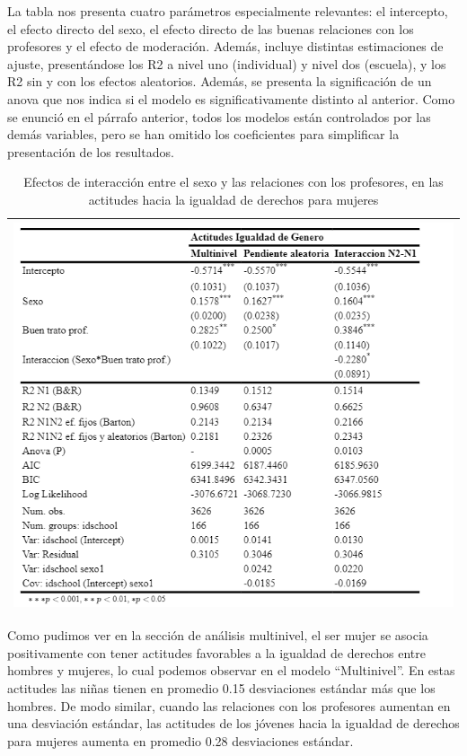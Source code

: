 \documentclass[12pt,twoside]{templates/facsothesis}
\begin{document}
La tabla nos presenta cuatro parámetros especialmente relevantes: el intercepto, el efecto directo del sexo, el efecto directo de las buenas relaciones con los profesores y el efecto de moderación. Además, incluye distintas estimaciones de ajuste, presentándose los R2 a nivel uno (individual) y nivel dos (escuela), y los R2 sin y con los efectos aleatorios. Además, se presenta la significación de un anova que nos indica si el modelo es significativamente distinto al anterior. Como se enunció en el párrafo anterior, todos los modelos están controlados por las demás variables, pero se han omitido los coeficientes para simplificar la presentación de los resultados.

\begin{longtable}[]{@{}l@{}}
\caption{\label{tab:unnamed-chunk-11}Efectos de interacción entre el sexo y las relaciones con los profesores, en las actitudes hacia la igualdad de derechos para mujeres}\tabularnewline
\toprule
\endhead
\includegraphics[width=\textwidth,height=1\textheight]{input/images/INTERACCION1.png} \\
\bottomrule
\end{longtable}

Como pudimos ver en la sección de análisis multinivel, el ser mujer se asocia positivamente con tener actitudes favorables a la igualdad de derechos entre hombres y mujeres, lo cual podemos observar en el modelo ``Multinivel''. En estas actitudes las niñas tienen en promedio 0.15 desviaciones estándar más que los hombres. De modo similar, cuando las relaciones con los profesores aumentan en una desviación estándar, las actitudes de los jóvenes hacia la igualdad de derechos para mujeres aumenta en promedio 0.28 desviaciones estándar.
\end{document}
